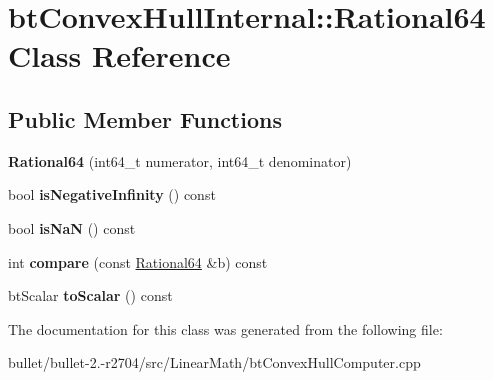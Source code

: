 \hypertarget{classbt_convex_hull_internal_1_1_rational64}{\section{bt\+Convex\+Hull\+Internal\+:\+:Rational64 Class Reference}
\label{classbt_convex_hull_internal_1_1_rational64}
}
\subsection*{Public Member Functions}
\begin{DoxyCompactItemize}
\item 
\hypertarget{classbt_convex_hull_internal_1_1_rational64_ae9dd2a4ba5462ae2ab320ba7c1fb18c9}{{\bfseries Rational64} (int64\+\_\+t numerator, int64\+\_\+t denominator)}\label{classbt_convex_hull_internal_1_1_rational64_ae9dd2a4ba5462ae2ab320ba7c1fb18c9}

\item 
\hypertarget{classbt_convex_hull_internal_1_1_rational64_a26f2a0d776d87b3d62b2839e76024b07}{bool {\bfseries is\+Negative\+Infinity} () const }\label{classbt_convex_hull_internal_1_1_rational64_a26f2a0d776d87b3d62b2839e76024b07}

\item 
\hypertarget{classbt_convex_hull_internal_1_1_rational64_ad63dbb4c3350fef987b2c67ed7b694ed}{bool {\bfseries is\+Na\+N} () const }\label{classbt_convex_hull_internal_1_1_rational64_ad63dbb4c3350fef987b2c67ed7b694ed}

\item 
\hypertarget{classbt_convex_hull_internal_1_1_rational64_ae5fc467c295511fa1790ce0822af5e04}{int {\bfseries compare} (const \hyperlink{classbt_convex_hull_internal_1_1_rational64}{Rational64} \&b) const }\label{classbt_convex_hull_internal_1_1_rational64_ae5fc467c295511fa1790ce0822af5e04}

\item 
\hypertarget{classbt_convex_hull_internal_1_1_rational64_aa4d3b45257938774306c913261b8fc79}{bt\+Scalar {\bfseries to\+Scalar} () const }\label{classbt_convex_hull_internal_1_1_rational64_aa4d3b45257938774306c913261b8fc79}

\end{DoxyCompactItemize}


The documentation for this class was generated from the following file\+:\begin{DoxyCompactItemize}
\item 
bullet/bullet-\/2.-\/r2704/src/\+Linear\+Math/bt\+Convex\+Hull\+Computer.\+cpp\end{DoxyCompactItemize}
